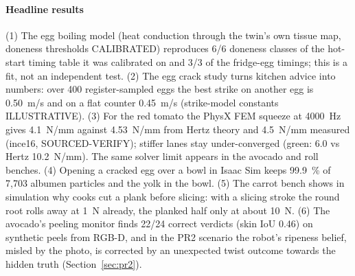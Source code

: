 \documentclass[10.5pt,a4paper]{article}
\begin{document}
\paragraph{Headline results} (1) The egg boiling model (heat conduction through the twin's own tissue map,
doneness thresholds CALIBRATED) reproduces 6/6 doneness classes of the
hot-start timing table it was calibrated on and 3/3 of the fridge-egg
timings; this is a fit, not an independent test. (2) The egg crack study turns kitchen advice into numbers: over 400
register-sampled eggs the best strike on another egg is 0.50~m/s and on a flat
counter 0.45~m/s (strike-model constants ILLUSTRATIVE). (3) For the red tomato the PhysX FEM squeeze at 4000~Hz gives
4.1~N/mm against 4.53~N/mm from Hertz
theory and 4.5~N/mm measured (ince16,
SOURCED-VERIFY); stiffer lanes stay under-converged (green: 6.0 vs Hertz
10.2~N/mm). The same solver limit appears in the avocado and roll benches.
(4) Opening a cracked egg over a bowl in Isaac Sim keeps 99.9~\% of 7,703 albumen particles and the yolk in the bowl.
(5) The carrot bench shows in simulation why cooks cut a plank before slicing: with a slicing stroke the round root
rolls away at 1~N already, the planked half only at about 10~N. (6) The avocado's peeling monitor finds 22/24 correct verdicts (skin IoU 0.46) on synthetic
peels from RGB-D, and in the PR2 scenario the robot's ripeness belief, misled by the photo, is corrected by an
unexpected twist outcome towards the hidden truth (Section~\ref{sec:pr2}).
\end{document}
